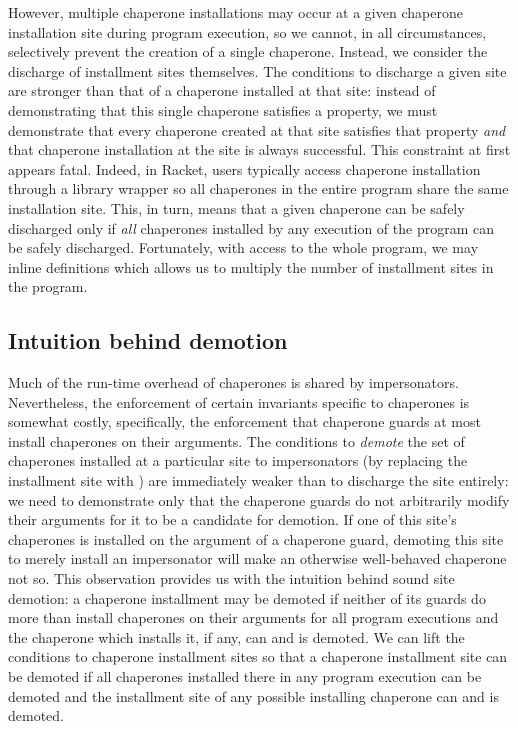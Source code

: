 \documentclass{sigplanconf}
\begin{document}
However, multiple chaperone installations may occur at a given chaperone installation site during program execution, so we cannot, in all circumstances, selectively prevent the creation of a single chaperone.
Instead, we consider the discharge of installment sites themselves.
The conditions to discharge a given site are stronger than that of a chaperone installed at that site: instead of demonstrating that this single chaperone satisfies a property, we must demonstrate that every chaperone created at that site satisfies that property \emph{and} that chaperone installation at the site is always successful.
This constraint at first appears fatal.
Indeed, in Racket, users typically access chaperone installation through a library wrapper so all chaperones in the entire program share the same installation site.
This, in turn, means that a given chaperone can be safely discharged only if \emph{all} chaperones installed by any execution of the program can be safely discharged.
Fortunately, with access to the whole program, we may inline definitions which allows us to multiply the number of installment sites in the program.


\subsection{Intuition behind demotion}

Much of the run-time overhead of chaperones is shared by impersonators.
Nevertheless, the enforcement of certain invariants specific to chaperones is somewhat costly, specifically, the enforcement that chaperone guards at most install chaperones on their arguments.
The conditions to \emph{demote} the set of chaperones installed at a particular site to impersonators (by replacing the  installment site with ) are immediately weaker than to discharge the site entirely: we need to demonstrate only that the chaperone guards do not arbitrarily modify their arguments for it to be a candidate for demotion.
If one of this site's chaperones is installed on the argument of a chaperone guard, demoting this site to merely install an impersonator will make an otherwise well-behaved chaperone not so.
This observation provides us with the intuition behind sound site demotion: a chaperone installment may be demoted if neither of its guards do more than install chaperones on their arguments for all program executions and the chaperone which installs it, if any, can and is demoted. 
We can lift the conditions to chaperone installment sites so that a chaperone installment site can be demoted if all chaperones installed there in any program execution can be demoted and the installment site of any possible installing chaperone can and is demoted.
\end{document}
